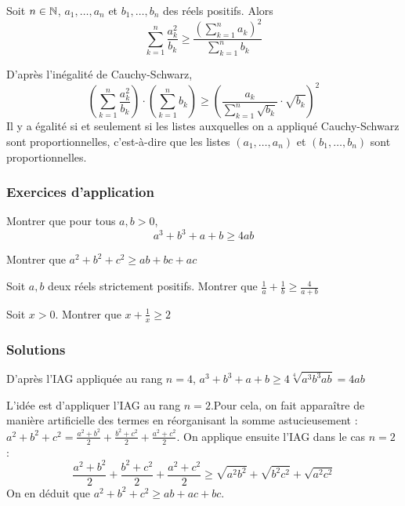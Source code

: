 \begin{pro}
Soit $n \in \mathbb N$, $a_1, \dots, a_n$ et $b_1, \dots, b_n$ des réels positifs. Alors
$$\sum_{k = 1}^n\frac{a_k^2}{b_k} \ge \frac{(\sum_{k = 1}^n a_k)^2}{\sum_{k = 1}^n b_k}$$
\end{pro}

\begin{preuve}
D'après l'inégalité de Cauchy-Schwarz,
$$(\sum_{k=1}^n\frac{a_k^2}{b_k})\cdot (\sum_{k=1}^nb_k) \ge (\frac{a_k}{\sum_{k=1}^n\sqrt{b_k}}\cdot \sqrt{b_k})^2$$
Il y a égalité si et seulement si les listes auxquelles on a appliqué Cauchy-Schwarz sont proportionnelles, c'est-à-dire que les listes $(a_1, \dots, a_n)$ et $(b_1, \dots, b_n)$ sont proportionnelles.
\end{preuve}


\subsubsection{Exercices d'application}


\begin{exo}
Montrer que pour tous $a, b > 0$,
$$a^3 + b^3 + a + b \ge 4ab$$
\end{exo}


\begin{exo}
Montrer que $a^2 + b^2 + c^2 \ge ab+bc+ac$
\end{exo}


\begin{exo}
Soit $a, b$ deux réels strictement positifs. Montrer que $\frac 1a + \frac 1b \ge \frac 4{a+b}$
\end{exo}


\begin{exo}
Soit $x>0$. Montrer que $x+\frac{1}{x} \ge 2$
\end{exo}


\subsubsection{Solutions}


\begin{sol}
D'après l'IAG appliquée au rang $n=4$, $a^3+b^3+a+b \ge 4\sqrt[4]{a^3b^3ab} = 4 ab $
\end{sol}


\begin{sol}
L'idée est d'appliquer l'IAG au rang $n=2$.Pour cela, on fait apparaître de manière artificielle des termes en réorganisant la somme astucieusement : $a^2+b^2+c^2 = \frac{a^2+b^2}2+\frac{b^2+c^2}2+\frac{a^2+c^2}2$. On applique ensuite l'IAG dans le cas $n=2$ :
$$\frac{a^2+b^2}2+\frac{b^2+c^2}2+\frac{a^2+c^2}2 \ge \sqrt{a^2b^2} + \sqrt{b^2c^2} + \sqrt{a^2c^2}$$
On en déduit que $a^2+b^2+c^2 \ge ab+ac+bc$.
\end{sol}


